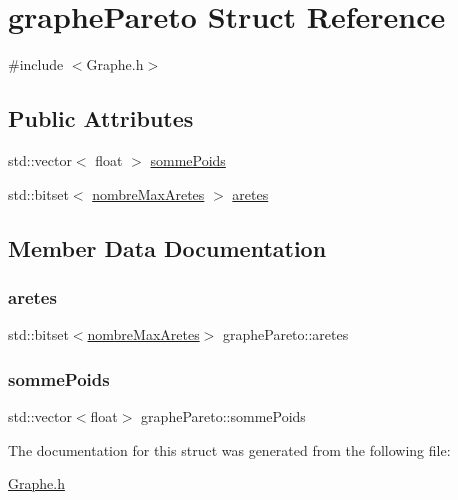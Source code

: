 \hypertarget{structgraphe_pareto}{}\section{graphe\+Pareto Struct Reference}
\label{structgraphe_pareto}


{\ttfamily \#include $<$Graphe.\+h$>$}

\subsection*{Public Attributes}
\begin{DoxyCompactItemize}
\item 
std\+::vector$<$ float $>$ \mbox{\hyperlink{structgraphe_pareto_ada46b8bdd6987c7dafd036beef779e15}{somme\+Poids}}
\item 
std\+::bitset$<$ \mbox{\hyperlink{libraries_8h_a5d5c6b0caa76f25c1987a5b7b1c335b8}{nombre\+Max\+Aretes}} $>$ \mbox{\hyperlink{structgraphe_pareto_aa2d8042cf42e1253976e3d71d8b6a1d6}{aretes}}
\end{DoxyCompactItemize}


\subsection{Member Data Documentation}
\mbox{\label{structgraphe_pareto_aa2d8042cf42e1253976e3d71d8b6a1d6}} 
\subsubsection{\texorpdfstring{aretes}{aretes}}
{\footnotesize\ttfamily std\+::bitset$<$\mbox{\hyperlink{libraries_8h_a5d5c6b0caa76f25c1987a5b7b1c335b8}{nombre\+Max\+Aretes}}$>$ graphe\+Pareto\+::aretes}

\mbox{\label{structgraphe_pareto_ada46b8bdd6987c7dafd036beef779e15}} 
\subsubsection{\texorpdfstring{sommePoids}{sommePoids}}
{\footnotesize\ttfamily std\+::vector$<$float$>$ graphe\+Pareto\+::somme\+Poids}



The documentation for this struct was generated from the following file\+:\begin{DoxyCompactItemize}
\item 
\mbox{\hyperlink{_graphe_8h}{Graphe.\+h}}\end{DoxyCompactItemize}
